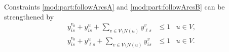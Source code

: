Constraints \eqref{mod:part:followArcsA} and \eqref{mod:part:followArcsB} can be strengthened by
\begin{subequations}\label{mod:partition}
\begin{align}
\label{mod:part:followArcsAStronger}
y^{v_0}_{is}+y^u_{i s} + \sum\limits_{v\in V\setminus N(u)}y^v_{\ell s}&\leq 1 & u\in V, \\
y^{v_0}_{is}+y^u_{\ell s} + \sum\limits_{v\in V\setminus N(u)}y^v_{i s}&\leq 1 & u\in V. 
\end{align}
\end{subequations}
